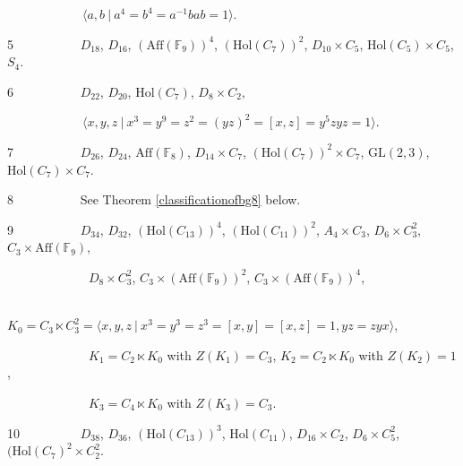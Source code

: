 \documentclass{amsart}
\theoremstyle{definition}
\numberwithin{equation}{section}
\begin{document}
\medskip


 \ \  \ \ \ \ \ \ \ \  \ \  $\langle a,b  \ | \ a^4=b^4=a^{-1}bab=1 \rangle$. 

\medskip
\medskip

5 \ \ \ \ \ \ \  \ \ \ $D_{18}$, $D_{16}$, ${(\mathrm{Aff}(\mathbb{F}_9))}^4$, $(\mathrm{Hol}(C_7))^2$, $D_{10} \times C_5$,                $\mathrm{Hol}(C_5) \times C_5$, $S_4$. 
                     
 \medskip
\medskip



6 \ \ \ \ \ \ \ \ \ \  $D_{22}$, $D_{20}$, $\mathrm{Hol}(C_7)$, $D_8 \times C_2$, 

\medskip

\ \ \ \ \ \ \ \ \ \ \ \ $\langle x,y,z \ | \ x^3=y^9=z^2= (yz)^2= [x,z]= y^5 z y z=1 \rangle$. 


\medskip
\medskip


7 \ \ \ \ \ \ \ \ \ \ $D_{26}$, $D_{24}$, $\mathrm{Aff}(\mathbb{F}_8)$, $D_{14} \times C_7$, $(\mathrm{Hol}(C_7))^2 \times C_7$, $\mathrm{GL}(2,3)$, $\mathrm{Hol}(C_7) \times C_7$. 

\medskip
\medskip

8 \ \ \ \ \ \ \ \ \ \ See Theorem \ref{classificationofbg8} below.

\medskip
\medskip


9 \ \ \ \ \ \ \ \ \ \  $D_{34}$, $D_{32}$,  $(\mathrm{Hol}(C_{13}))^4$, $(\mathrm{Hol}(C_{11}))^2$, $A_4 \times C_3$, $D_6 \times C^2_3 $, $C_3 \times \mathrm{Aff}(\mathbb{F}_9)$, 

\medskip


\ \ \ \ \ \ \ \ \  \ \ \ \ $D_8 \times C^2_3$, $C_3 \times (\mathrm{Aff}(\mathbb{F}_9))^2$, $C_3 \times (\mathrm{Aff}(\mathbb{F}_9))^4$, 

\medskip

\ \ \ \ \ \ \ \ \  \ \ \ \  $K_0=C_3 \ltimes C^2_3 =\langle x,y,z \ | \  x^3 = y^3 = z^3= [x,y]=[x,z] = 1, yz = zyx \rangle$,  

\medskip

\ \ \ \ \ \ \ \ \ \ \  \ \ $K_1=C_2 \ltimes K_0$ with $Z(K_1)=C_3$,   $K_2=C_2 \ltimes K_0 $ with $Z(K_2)=1$, 


\medskip

 
 
 
\ \ \ \ \ \ \ \ \ \ \  \ \ $K_3= C_4 \ltimes K_0$ with $Z(K_3)=C_3$. 

\medskip
\medskip


10 \ \  \ \ \ \ \ \ \ $D_{38}$, $D_{36}$, $(\mathrm{Hol}(C_{13}))^3$, $\mathrm{Hol}(C_{11})$, $D_{16} \times C_2$, $D_6 \times C^2_5$, $(\mathrm{Hol}(C_7)^2 \times C^2_2$. 
\end{document}
